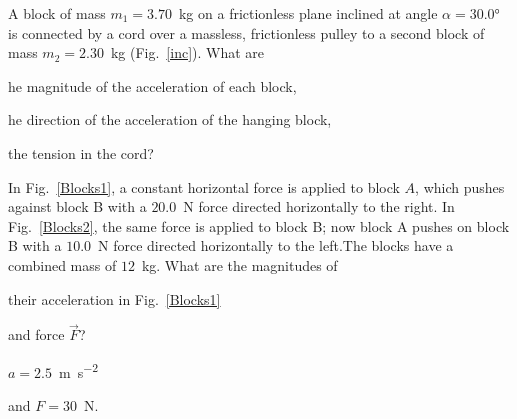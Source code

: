 \begin{problem}\label{prb:inc}
	A block of mass $m_1 = 3.70$~\si{\kilo\gram} on a frictionless plane inclined
	at angle $\alpha = \ang{30.0}$ is connected by a cord over a massless,
	frictionless pulley to a second block of mass $m_2 = 2.30$~\si{\kilo\gram} (Fig.~\ref{inc}). What are 
	\begin{enumerate*}[label = (\alph*)]
		\item he magnitude of the acceleration of each block,
		\item he direction of the acceleration of the hanging block,
		\item the tension in the cord?
	\end{enumerate*}
\end{problem}


\begin{problem}\label{prb:Blocks}
	In Fig.~\ref{Blocks1}, a constant horizontal force is applied to block $A$, which pushes against block B with a $20.0$~\si{\newton} force directed horizontally to the right. In Fig.~\ref{Blocks2}, the same force is applied
	to block B; now block A pushes on block B with a $10.0$~\si{\newton}  force directed horizontally to the left.The blocks have a combined mass of $12$~\si{\kilo\gram}. What are the magnitudes of
	\begin{enumerate*}[label = (\alph*)]
		\item their acceleration in Fig.~\ref{Blocks1}
		\item and force $\vec F$?
	\end{enumerate*}
\begin{solution}
	\begin{enumerate*}[label = (\alph*)]
	\item $a = 2.5$~\si{\meter\per\square\second}
	\item and $F = 30$~\si{\newton}.
	\end{enumerate*}	
\end{solution}
\end{problem}

